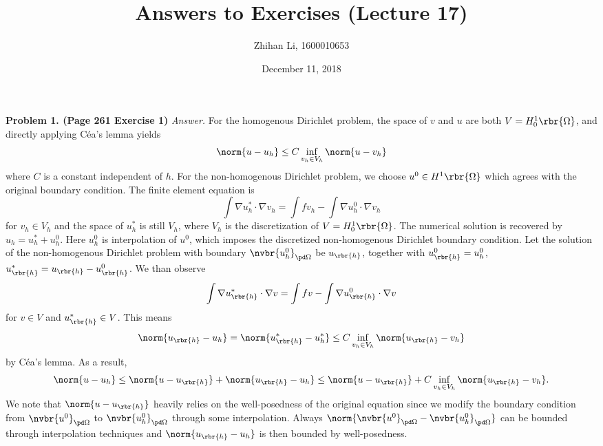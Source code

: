 \documentclass[english, nochinese]{pnote}
\title{Answers to Exercises (Lecture 17)}
\author{Zhihan Li, 1600010653}
\date{December 11, 2018}
\begin{document}
\maketitle

\textbf{Problem 1. (Page 261 Exercise 1)} \textit{Answer.} For the homogenous Dirichlet problem, the space of $v$ and $u$ are both $ V = H^1_0 \rbr{\Omega} $, and directly applying C\'ea's lemma yields
\begin{equation}
\norm{ u - u_h } \le C \inf_{ v_h \in V_h } \norm{ u - v_h }
\end{equation}
where $C$ is a constant independent of $h$. For the non-homogenous Dirichlet problem, we choose $ u^0 \in H^1 \rbr{\Omega} $ which agrees with the original boundary condition. The finite element equation is
\begin{equation}
\int \nabla u_h^{\ast} \cdot \nabla v_h = \int f v_h - \int \nabla u_h^0 \cdot \nabla v_h
\end{equation}
for $ v_h \in V_h $ and the space of $u_h^{\ast}$ is still $V_h$, where $V_h$ is the discretization of $ V = H^1_0 \rbr{\Omega} $. The numerical solution is recovered by $ u_h = u_h^{\ast} + u_h^0 $. Here $u_h^0$ is interpolation of $u^0$, which imposes the discretized non-homogenous Dirichlet boundary condition. Let the solution of the non-homogenous Dirichlet problem with boundary $ \nvbr{u_h^0}_{ \pd \Omega } $ be $u_{\rbr{h}}$, together with $ u_{\rbr{h}}^0 = u_h^0 $, $ u_{\rbr{h}}^{\ast} = u_{\rbr{h}} - u_{\rbr{h}}^0 $. We than observe
\begin{equation}
\int \nabla u_{\rbr{h}}^{\ast} \cdot \nabla v = \int f v - \int \nabla u_{\rbr{h}}^0 \cdot \nabla v
\end{equation}
for $ v \in V $ and $ u_{\rbr{h}}^{\ast} \in V $. This means
\begin{equation}
\norm{ u_{\rbr{h}} - u_h } = \norm{ u_{\rbr{h}}^{\ast} - u_h^{\ast} } \le C \inf_{ v_h \in V_h } \norm{ u_{\rbr{h}} - v_h }
\end{equation}
by C\'ea's lemma. As a result,
\begin{equation}
\norm{ u - u_h } \le \norm{ u - u_{\rbr{h}} } + \norm{ u_{\rbr{h}} - u_h } \le \norm{ u - u_{\rbr{h}} } + C \inf_{ v_h \in V_h } \norm{ u_{\rbr{h}} - v_h }.
\end{equation}
We note that $ \norm{ u - u_{\rbr{h}} } $ heavily relies on the well-posedness of the original equation since we modify the boundary condition from $ \nvbr{u^0}_{ \pd \Omega } $ to $ \nvbr{u_h^0}_{ \pd \Omega } $ through some interpolation. Always $ \norm{ \nvbr{u^0}_{ \pd \Omega } - \nvbr{u_h^0}_{ \pd \Omega } } $ can be bounded through interpolation techniques and $ \norm{ u_{\rbr{h}} - u_h } $ is then bounded by well-posedness.
\end{document}
